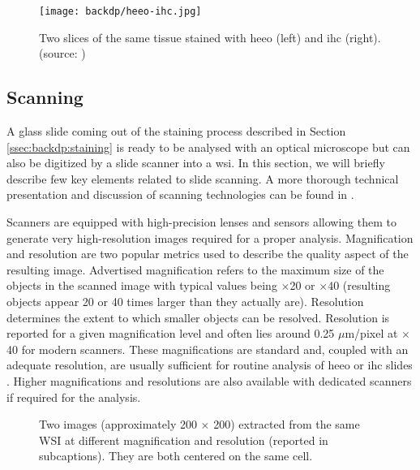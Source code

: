 \begin{figure}
  \centering
  \texttt{[image: backdp/heeo-ihc.jpg]}
  \caption{Two slices of the same tissue stained with \acrshort{heeo} (left) and \acrshort{ihc} (right). \\(source: \parencite{litjens2018camelyon})}
  \label{fig:backdp:heeo-ihc}
\end{figure}

\subsection{Scanning}
\label{ssec:backdp:scanning}

A glass slide coming out of the staining process described in Section \ref{ssec:backdp:staining} is ready to be analysed with an optical microscope but can also be digitized by a slide scanner into a \acrshort{wsi}. In this section, we will briefly describe few key elements related to slide scanning. A more thorough technical presentation and discussion of scanning technologies can be found in \parencite{patel2021contemporary}. 


Scanners are equipped with high-precision lenses and sensors allowing them to generate very high-resolution images required for a proper analysis. Magnification and resolution are two popular metrics used to describe the quality aspect of the resulting image. Advertised magnification refers to the maximum size of the objects in the scanned image with typical values being $\times$20 or $\times$40 (\ie resulting objects appear 20 or 40 times larger than they actually are). Resolution determines the extent to which smaller objects can be resolved. Resolution is reported for a given magnification level and often lies around 0.25 $\mu$m/pixel at $\times$40 for modern scanners. These magnifications are standard and, coupled with an adequate resolution, are usually sufficient for routine analysis of \acrshort{heeo} or \acrshort{ihc} slides \parencite{zarella2019practical}. Higher magnifications and resolutions are also available with dedicated scanners if required for the analysis.

\begin{figure}
  \centering
  \hspace{0.5cm}
  \caption{Two images (approximately 200 $\times$ 200) extracted from the same WSI at different magnification and resolution (reported in subcaptions). They are both centered on the same cell.}
\end{figure}

